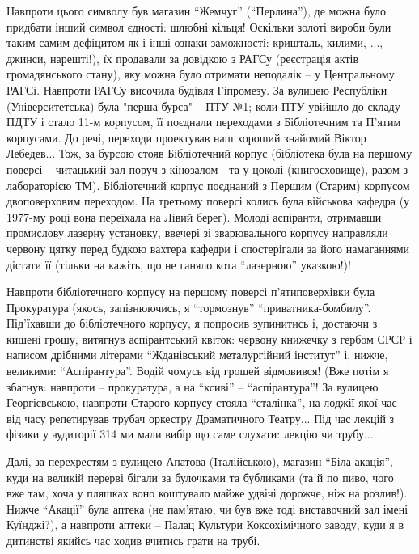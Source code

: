 Навпроти цього символу був магазин \enquote{Жемчуг} (\enquote{Перлина}), де можна було придбати
інший символ єдності: шлюбні кільця! Оскільки золоті вироби були таким самим
дефіцитом як і інші ознаки заможності: кришталь, килими, ..., джинси,
нарешті!), їх продавали за довідкою з РАГСу (реєстрація актів громадянського
стану), яку можна було отримати неподалік – у Центральному РАГСі.  Навпроти
РАГСу височила будівля Гіпромезу. За вулицею Республіки (Університетська) була
"перша бурса" – ПТУ №1; коли ПТУ увійшло до складу ПДТУ і стало 11-м корпусом,
її поєднали переходами з Бібліотечним та П'ятим корпусами. До речі, переходи
проектував наш хороший знайомий Віктор Лебедев... Тож, за бурсою стояв
Бібліотечний корпус (бібліотека була на першому поверсі – читацький зал поруч з
кінозалом - та у цоколі (книгосховище), разом з лабораторією ТМ). Бібліотечний
корпус поєднаний з Першим (Старим) корпусом двоповерховим переходом. На
третьому поверсі колись була військова кафедра (у 1977-му році вона переїхала
на Лівий берег). Молоді аспіранти, отримавши промислову лазерну установку,
ввечері зі зварювального корпусу направляли червону цятку перед будкою вахтера
кафедри і спостерігали за його намаганнями дістати її (тільки на кажіть, що не
ганяло кота \enquote{лазерною} указкою!)!

Навпроти бібліотечного корпусу на першому поверсі п’ятиповерхівки була
Прокуратура (якось, запізнюючись, я \enquote{тормознув} \enquote{приватника-бомбилу}.
Під’їхавши до бібліотечного корпусу, я попросив зупинитись і, достаючи з кишені
грошу, витягнув аспірантський квіток: червону книжечку з гербом СРСР і написом
дрібними літерами \enquote{Жданівський металургійний інститут} і, нижче, великими:
\enquote{Аспірантура}. Водій чомусь від грошей відмовився! (Вже потім я збагнув:
навпроти – прокуратура, а на \enquote{ксиві} – \enquote{аспірантура}! За вулицею Георгієвською,
навпроти Старого корпусу стояла \enquote{сталінка}, на лоджії якої час від часу
репетирував трубач оркестру Драматичного Театру... Під час лекцій з фізики у
аудиторії 314 ми мали вибір що саме слухати: лекцію чи трубу...

Далі, за перехрестям з вулицею Апатова (Італійською), магазин \enquote{Біла акація},
куди на великій перерві бігали за булочками та бубликами (та й по пиво, чого
вже там, хоча у пляшках воно коштувало майже удвічі дорожче, ніж на розлив!).
Нижче \enquote{Акації} була аптека (не пам'ятаю, чи був вже тоді виставочний зал імені
Куїнджі?), а навпроти аптеки – Палац Культури Коксохімічного заводу, куди я в
дитинстві якийсь час ходив вчитись грати на трубі.

